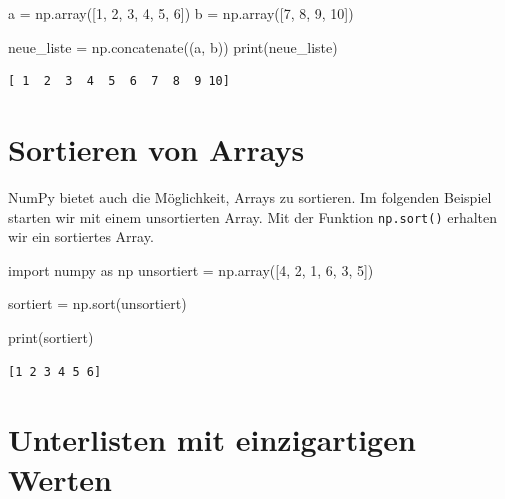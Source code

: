 \documentclass[
  letterpaper,
  DIV=11,
  numbers=noendperiod]{scrreprt}
\newenvironment{Shaded}{\begin{snugshade}}{\end{snugshade}}
\newcommand{\BuiltInTok}[1]{\textcolor[rgb]{0.00,0.23,0.31}{#1}}
\newcommand{\DecValTok}[1]{\textcolor[rgb]{0.68,0.00,0.00}{#1}}
\newcommand{\ImportTok}[1]{\textcolor[rgb]{0.00,0.46,0.62}{#1}}
\newcommand{\NormalTok}[1]{\textcolor[rgb]{0.00,0.23,0.31}{#1}}
\newcommand{\OperatorTok}[1]{\textcolor[rgb]{0.37,0.37,0.37}{#1}}
\begin{document}
\begin{Shaded}
\begin{Highlighting}[]
\NormalTok{a }\OperatorTok{=}\NormalTok{ np.array([}\DecValTok{1}\NormalTok{, }\DecValTok{2}\NormalTok{, }\DecValTok{3}\NormalTok{, }\DecValTok{4}\NormalTok{, }\DecValTok{5}\NormalTok{, }\DecValTok{6}\NormalTok{])}
\NormalTok{b }\OperatorTok{=}\NormalTok{ np.array([}\DecValTok{7}\NormalTok{, }\DecValTok{8}\NormalTok{, }\DecValTok{9}\NormalTok{, }\DecValTok{10}\NormalTok{])}

\NormalTok{neue\_liste }\OperatorTok{=}\NormalTok{ np.concatenate((a, b))}
\BuiltInTok{print}\NormalTok{(neue\_liste)}
\end{Highlighting}
\end{Shaded}

\begin{verbatim}
[ 1  2  3  4  5  6  7  8  9 10]
\end{verbatim}

\section{Sortieren von Arrays}\label{sortieren-von-arrays}

NumPy bietet auch die Möglichkeit, Arrays zu sortieren. Im folgenden
Beispiel starten wir mit einem unsortierten Array. Mit der Funktion
\texttt{np.sort()} erhalten wir ein sortiertes Array.

\begin{Shaded}
\begin{Highlighting}[]
\ImportTok{import}\NormalTok{ numpy }\ImportTok{as}\NormalTok{ np}
\NormalTok{unsortiert }\OperatorTok{=}\NormalTok{ np.array([}\DecValTok{4}\NormalTok{, }\DecValTok{2}\NormalTok{, }\DecValTok{1}\NormalTok{, }\DecValTok{6}\NormalTok{, }\DecValTok{3}\NormalTok{, }\DecValTok{5}\NormalTok{])}

\NormalTok{sortiert }\OperatorTok{=}\NormalTok{ np.sort(unsortiert)}

\BuiltInTok{print}\NormalTok{(sortiert)}
\end{Highlighting}
\end{Shaded}

\begin{verbatim}
[1 2 3 4 5 6]
\end{verbatim}

\section{Unterlisten mit einzigartigen
Werten}\label{unterlisten-mit-einzigartigen-werten}
\end{document}
